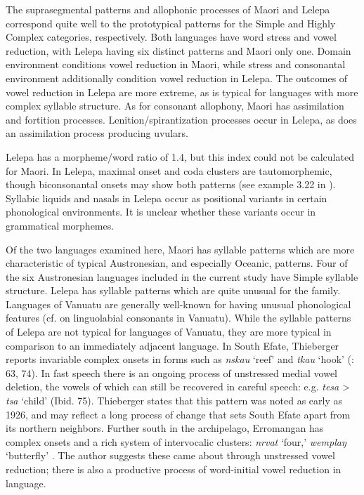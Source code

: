   The suprasegmental patterns and allophonic processes of Maori and Lelepa correspond quite well to the prototypical patterns for the Simple and Highly Complex categories, respectively. Both languages have word stress and vowel reduction, with Lelepa having six distinct patterns and Maori only one. Domain environment conditions vowel reduction in Maori, while stress and consonantal environment additionally condition vowel reduction in Lelepa. The outcomes of vowel reduction in Lelepa are more extreme, as is typical for languages with more complex syllable structure. As for consonant allophony, Maori has assimilation and fortition processes. Lenition/spirantization processes occur in Lelepa, as does an assimilation process producing uvulars.

  Lelepa has a morpheme/word ratio of 1.4, but this index could not be calculated for Maori. In Lelepa, maximal onset and coda clusters are tautomorphemic, though biconsonantal onsets may show both patterns (see example 3.22 in ). Syllabic liquids and nasals in Lelepa occur as positional variants in certain phonological environments. It is unclear whether these variants occur in grammatical morphemes.

  Of the two languages examined here, Maori has syllable patterns which are more characteristic of typical Austronesian, and especially Oceanic, patterns. Four of the six Austronesian languages included in the current study have Simple syllable structure. Lelepa has syllable patterns which are quite unusual for the family. Languages of Vanuatu are generally well-known for having unusual phonological features (cf. \citealt{Maddieson1989b} on linguolabial consonants in Vanuatu). While the syllable patterns of Lelepa are not typical for languages of Vanuatu, they are more typical in comparison to an immediately adjacent language. In South Efate, Thieberger reports invariable complex onsets in forms such as \textit{nskau} ‘reef’ and \textit{tkau} ‘hook’ (\citealt{Thieberger2004}: 63, 74). In fast speech there is an ongoing process of unstressed medial vowel deletion, the vowels of which can still be recovered in careful speech: e.g. \textit{tesa} > \textit{tsa} ‘child’ (Ibid. 75). Thieberger states that this pattern was noted as early as 1926, and may reflect a long process of change that sets South Efate apart from its northern neighbors. Further south in the archipelago, Erromangan has complex onsets and a rich system of intervocalic clusters: \textit{nrvat} ‘four,’ \textit{wemplaŋ} ‘butterfly’ \citep[20--22]{Crowley1998}. The author suggests these came about through unstressed vowel reduction; there is also a productive process of word-initial vowel reduction in language.

